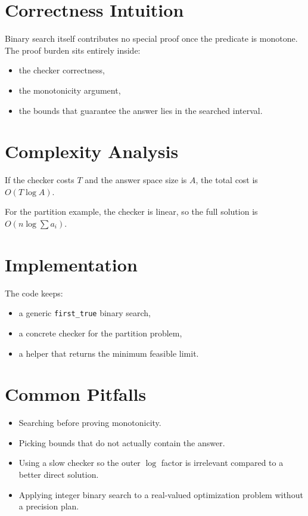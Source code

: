 \section*{Correctness Intuition}

Binary search itself contributes no special proof once the predicate is monotone. The proof burden sits entirely inside:

\begin{itemize}
  \item the checker correctness,
  \item the monotonicity argument,
  \item the bounds that guarantee the answer lies in the searched interval.
\end{itemize}

\section*{Complexity Analysis}

If the checker costs \(T\) and the answer space size is \(A\), the total cost is \(O(T \log A)\).

For the partition example, the checker is linear, so the full solution is \(O(n \log \sum a_i)\).

\section*{Implementation}

The code keeps:

\begin{itemize}
  \item a generic \texttt{first\_true} binary search,
  \item a concrete checker for the partition problem,
  \item a helper that returns the minimum feasible limit.
\end{itemize}

\section*{Common Pitfalls}

\begin{itemize}
  \item Searching before proving monotonicity.
  \item Picking bounds that do not actually contain the answer.
  \item Using a slow checker so the outer \(\log\) factor is irrelevant compared to a better direct solution.
  \item Applying integer binary search to a real-valued optimization problem without a precision plan.
\end{itemize}

